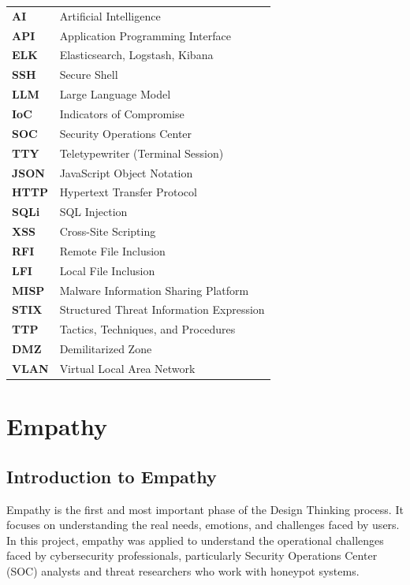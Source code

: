 \documentclass[12pt,a4paper]{report}
\begin{document}
\begin{tabular}{p{4cm} p{10cm}}

\textbf{AI} & Artificial Intelligence \\
\textbf{API} & Application Programming Interface \\
\textbf{ELK} & Elasticsearch, Logstash, Kibana \\
\textbf{SSH} & Secure Shell \\
\textbf{LLM} & Large Language Model \\
\textbf{IoC} & Indicators of Compromise \\
\textbf{SOC} & Security Operations Center \\
\textbf{TTY} & Teletypewriter (Terminal Session) \\
\textbf{JSON} & JavaScript Object Notation \\
\textbf{HTTP} & Hypertext Transfer Protocol \\
\textbf{SQLi} & SQL Injection \\
\textbf{XSS} & Cross-Site Scripting \\
\textbf{RFI} & Remote File Inclusion \\
\textbf{LFI} & Local File Inclusion \\
\textbf{MISP} & Malware Information Sharing Platform \\
\textbf{STIX} & Structured Threat Information Expression \\
\textbf{TTP} & Tactics, Techniques, and Procedures \\
\textbf{DMZ} & Demilitarized Zone \\
\textbf{VLAN} & Virtual Local Area Network \\

\end{tabular}

\newpage

\pagestyle{mainpages}

\chapter{Empathy}
\thispagestyle{mainpages}

\section{Introduction to Empathy}

Empathy is the first and most important phase of the Design Thinking process. It focuses on understanding the real needs, emotions, and challenges faced by users. In this project, empathy was applied to understand the operational challenges faced by cybersecurity professionals, particularly Security Operations Center (SOC) analysts and threat researchers who work with honeypot systems.
\end{document}

